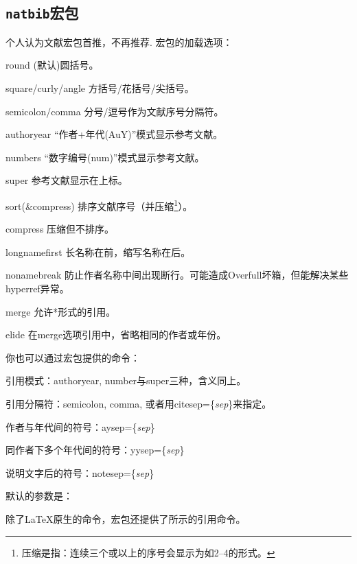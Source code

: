 \subsection{\texttt{natbib}宏包}
个人认为文献宏包首推，不再推荐. 宏包的加载选项：
\begin{para}
\item[round] (默认)圆括号。
\item[square/curly/angle] 方括号/花括号/尖括号。
\item[semicolon/comma] 分号/逗号作为文献序号分隔符。
\item[authoryear] “作者+年代(AuY)”模式显示参考文献。
\item[numbers] “数字编号(num)”模式显示参考文献。
\item[super] 参考文献显示在上标。
\item[sort(\&compress)] 排序文献序号（并压缩\footnote{压缩是指：连续三个或以上的序号会显示为如2--4的形式。}）。
\item[compress] 压缩但不排序。
\item[longnamefirst] 长名称在前，缩写名称在后。
\item[nonamebreak] 防止作者名称中间出现断行。可能造成Overfull坏箱，但能解决某些hyperref异常。
\item[merge] 允许*形式的引用。
\item[elide] 在merge选项引用中，省略相同的作者或年份。
\end{para}

你也可以通过宏包提供的命令：
\begin{feae}
\item 引用模式：authoryear, number与super三种，含义同上。
\item 引用分隔符：semicolon, comma, 或者用citesep=\{\textit{sep}\}来指定。
\item 作者与年代间的符号：aysep=\{\textit{sep}\}
\item 同作者下多个年代间的符号：yysep=\{\textit{sep}\}
\item 说明文字后的符号：notesep=\{\textit{sep}\}
\end{feae}

默认的参数是：
\begin{latex}
\end{latex}

除了\LaTeX 原生的命令，宏包还提供了所示的引用命令。

